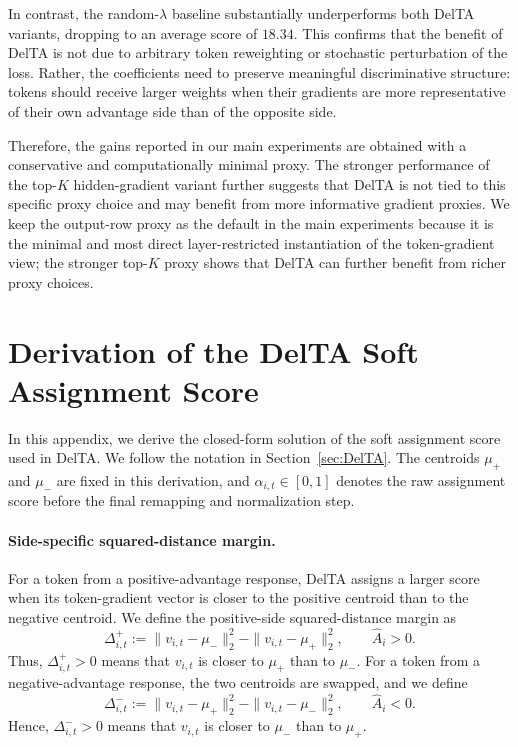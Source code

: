 \documentclass{article} %
\begin{document}
In contrast, the random-\(\lambda\) baseline substantially underperforms both
DelTA variants, dropping to an average score of \(18.34\). This confirms that
the benefit of DelTA is not due to arbitrary token reweighting or stochastic
perturbation of the loss. Rather, the coefficients need to preserve meaningful
discriminative structure: tokens should receive larger weights when their
gradients are more representative of their own advantage side than of the
opposite side.

Therefore, the gains reported in our main experiments are obtained with a
conservative and computationally minimal proxy. The stronger performance of the
top-\(K\) hidden-gradient variant further suggests that DelTA is not tied to this
specific proxy choice and may benefit from more informative gradient proxies. We keep the output-row proxy as the default in the main experiments because it is the minimal and most direct layer-restricted instantiation of the token-gradient view; the stronger top-\(K\) proxy shows that DelTA can further benefit from richer proxy choices.

\section{Derivation of the DelTA Soft Assignment Score}
\label{app:DelTA-weight-derivation}

In this appendix, we derive the closed-form solution of the soft assignment
score used in DelTA. We follow the notation in Section~\ref{sec:DelTA}. The
centroids \(\mu_+\) and \(\mu_-\) are fixed in this derivation, and
\(\alpha_{i,t}\in[0,1]\) denotes the raw assignment score before the final
remapping and normalization step.

\paragraph{Side-specific squared-distance margin.}
For a token from a positive-advantage response, DelTA assigns a larger score
when its token-gradient vector is closer to the positive centroid than to the
negative centroid. We define the positive-side squared-distance margin as
\[
\Delta_{i,t}^{+}
:=
\|v_{i,t}-\mu_-\|_2^2
-
\|v_{i,t}-\mu_+\|_2^2,
\qquad
\hat A_i>0.
\]
Thus, \(\Delta_{i,t}^{+}>0\) means that \(v_{i,t}\) is closer to \(\mu_+\) than
to \(\mu_-\). For a token from a negative-advantage response, the two centroids
are swapped, and we define
\[
\Delta_{i,t}^{-}
:=
\|v_{i,t}-\mu_+\|_2^2
-
\|v_{i,t}-\mu_-\|_2^2,
\qquad
\hat A_i<0.
\]
Hence, \(\Delta_{i,t}^{-}>0\) means that \(v_{i,t}\) is closer to \(\mu_-\) than
to \(\mu_+\).
\end{document}
